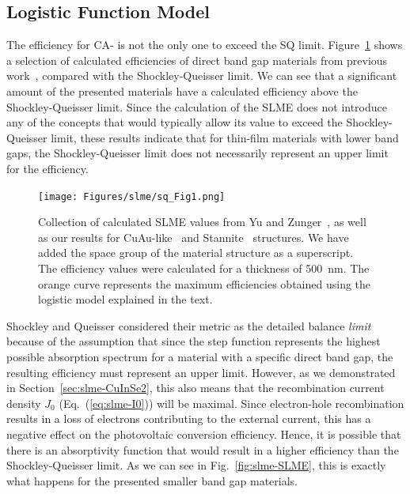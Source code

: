 \begin{refsection}
\subsection{Logistic Function Model} \label{sec:slme-logistic} 
 
The efficiency for CA- is not the only one to exceed the SQ limit. 
Figure~\ref{fig:slme-logistic} shows a selection of calculated efficiencies of 
direct band gap materials from previous work~\cite{Yu2012, Bercx2016, 
Sarmadian2016}, compared with the Shockley-Queisser limit.  We can see that a 
significant amount of the presented materials have a calculated efficiency 
above the Shockley-Queisser limit. Since the calculation of the SLME does not 
introduce any of the concepts that would typically allow its value to exceed 
the Shockley-Queisser limit, these results indicate that for thin-film 
materials with lower band gaps, the Shockley-Queisser limit does not 
necessarily represent an upper limit for the efficiency. 
 
\begin{figure}[h] 
\centering 
\texttt{[image: Figures/slme/sq\_Fig1.png]} 
\caption{Collection of calculated SLME values from Yu and 
Zunger~\cite{Yu2012}, as well as our results for CuAu-like~\cite{Bercx2016} 
and Stannite~\cite{Sarmadian2016} structures. We have added the space group of 
the material structure as a superscript. The efficiency values were calculated 
for a thickness of 500~\si{\nano\meter}. The orange curve represents the 
maximum efficiencies obtained using the logistic model explained in the text.} 
\label{fig:slme-logistic} 
\end{figure} 
 
Shockley and Queisser considered their metric as the detailed balance 
\textit{limit} because of the assumption that since the step function 
represents the highest possible absorption spectrum for a material with a 
specific direct band gap, the resulting efficiency must represent an upper 
limit. However, as we demonstrated in Section~\ref{sec:slme-CuInSe2}, this 
also means that the recombination current density $J_0$ 
(Eq.~(\ref{eq:slme-I0})) will be maximal. Since electron-hole recombination 
results in a loss of electrons contributing to the external current, this has 
a negative effect on the photovoltaic conversion efficiency. Hence, it is 
possible that there is an absorptivity function that would result in a higher 
efficiency than the Shockley-Queisser limit. As we can see in 
Fig.~\ref{fig:slme-SLME}, this is exactly what happens for the presented 
smaller band gap materials. 
 

\end{refsection}
